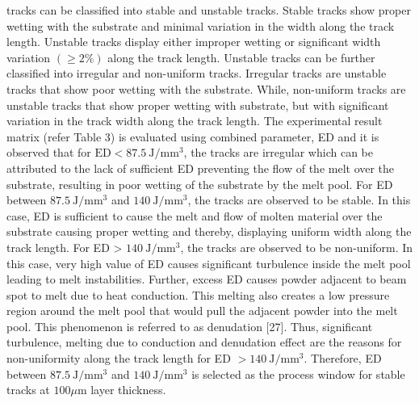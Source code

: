 \documentclass[10pt]{article}
\begin{document}
tracks can be classified into stable and unstable tracks. Stable tracks show proper wetting with the substrate and minimal variation in the width along the track length. Unstable tracks display either improper wetting or significant width variation $(\geq 2 \%)$ along the track length. Unstable tracks can be further classified into irregular and non-uniform tracks. Irregular tracks are unstable tracks that show poor wetting with the substrate. While, non-uniform tracks are unstable tracks that show proper wetting with substrate, but with significant variation in the track width along the track length. The experimental result matrix (refer Table 3) is evaluated using combined parameter, ED and it is observed that for $\mathrm{ED}<87.5 \mathrm{~J} / \mathrm{mm}^{3}$, the tracks are irregular which can be attributed to the lack of sufficient ED preventing the flow of the melt over the substrate, resulting in poor wetting of the substrate by the melt pool. For ED between $87.5 \mathrm{~J} / \mathrm{mm}^{3}$ and $140 \mathrm{~J} / \mathrm{mm}^{3}$, the tracks are observed to be stable. In this case, ED is sufficient to cause the melt and flow of molten material over the substrate causing proper wetting and thereby, displaying uniform width along the track length. For ED > $140 \mathrm{~J} / \mathrm{mm}^{3}$, the tracks are observed to be non-uniform. In this case, very high value of ED causes significant turbulence inside the melt pool leading to melt instabilities. Further, excess ED causes powder adjacent to beam spot to melt due to heat conduction. This melting also creates a low pressure region around the melt pool that would pull the adjacent powder into the melt pool. This phenomenon is referred to as denudation [27]. Thus, significant turbulence, melting due to conduction and denudation effect are the reasons for non-uniformity along the track length for ED $>140 \mathrm{~J} / \mathrm{mm}^{3}$. Therefore, ED between $87.5 \mathrm{~J} / \mathrm{mm}^{3}$ and $140 \mathrm{~J} / \mathrm{mm}^{3}$ is selected as the process window for stable tracks at $100 \mu \mathrm{m}$ layer thickness.
\end{document}
